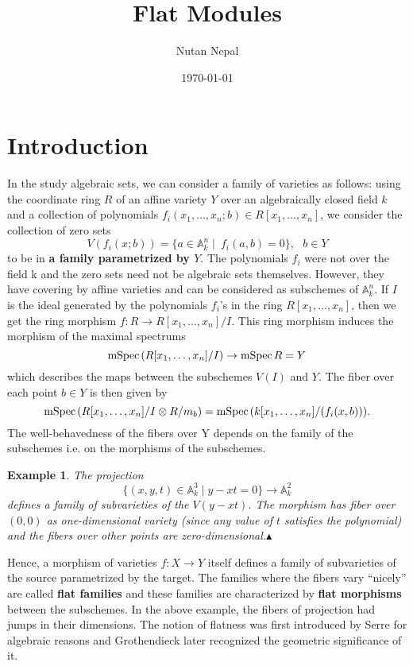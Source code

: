 \documentclass[12pt]{article}
\title{Flat Modules}
\author{Nutan Nepal}
\date{\today}
\theoremstyle{mytheoremstyle}
\newtheorem{example}{Example}
\newcommand{\bA}{\mathbb{A}}
\newcommand{\mspec}{\text{mSpec\hspace*{.5mm}}}
\begin{document}
\maketitle

\makebox[\linewidth]{\rule{200mm}{1pt}}
\section{Introduction}
\hspace*{8mm}In the study algebraic sets, we can consider a family of varieties as
follows: using the coordinate ring $R$ of an
affine variety $Y$ over an algebraically closed field $k$ and a collection
of polynomials $f_i(x_1,\ldots,x_n; b)\in R[x_1,\ldots,x_n]$, we consider
the collection of zero sets
$$V(f_i(x;b))=\{a\in \mathbb{A}^n_k\mid \ f_i(a,b)=0\},\ \ \ b\in Y$$ to be
in \textbf{a family parametrized by $Y$}. The polynomials $f_i$ were not over the
field k and the zero sets need not be algebraic sets themselves. However,
they have covering by affine varieties and can be considered
as subschemes of $\bA^n_k$.
If $I$ is the ideal generated by the polynomials $f_i$'s
in the ring $R[x_1,\ldots,x_n]$,
then we get the ring morphism $f\colon R\to R[x_1,\ldots,x_n]/I$.
This ring morphism induces the morphism of the maximal spectrums
$$\mspec (R[x_1,\ldots,x_n]/I) \to \mspec R = Y$$
which describes the maps between the subschemes $V(I)$ and $Y$.
The fiber over each point $b\in Y$ is then given by
$$\mspec (R[x_1,\ldots,x_n]/I\otimes R/m_b)=\mspec (k[x_1,\ldots,x_n]
/(f_i(x,b))).$$
The well-behavedness of the fibers over Y depends on the family of
the subschemes i.e. on the morphisms of the subschemes.
\begin{example}
    The projection
    $$\{(x,y,t)\in \bA^3_k\mid y-xt=0\}\to \bA^2_k$$
    defines a family of subvarieties of the $V(y-xt)$.
    The morphism has fiber over $(0,0)$ as one-dimensional variety
    (since any value of $t$
    satisfies the polynomial) and the fibers over other points are
    zero-dimensional.$\blacktriangle$
\end{example}

\hspace*{8mm}Hence, a morphism of varieties $f:X\to Y$ itself defines a family of subvarieties
of the source parametrized by the target. The families where the
fibers vary ``nicely'' are called \textbf{flat families} and these
families are characterized by \textbf{flat morphisms} between
the subschemes. In the above example, the fibers of projection had
jumps in their dimensions.
The notion of flatness was first introduced by
Serre for algebraic reasons and Grothendieck later recognized the
geometric significance of it.
\end{document}
